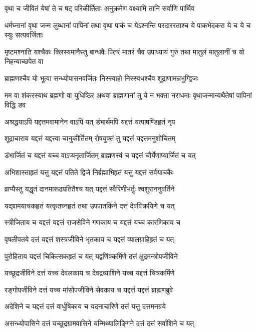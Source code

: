 \twolineshloka
{वृथा च जीवितं येषां ते च षट् परिकीर्तिताः}
{अनुक्रमेण वक्ष्यामि तानि सर्वाणि पार्थिव}


\threelineshloka
{धर्मघ्नानां वृथा जन्म लुब्धानां पापिनां तथा}
{वृथा पाकं च येऽश्नन्ति परदाररताश्च ये}
{पाकभेदकरा ये च ये च स्युः सत्यवर्जिताः}


\threelineshloka
{मृष्टमश्नाति यश्चैकः क्लिस्यमानैस्तु बान्धवैः}
{पितरं मातरं चैव उपाध्यायं गुरुं तथा}
{मातुलं मातुलानीं च यो निहन्याच्छपेत वा}


\twolineshloka
{ब्राह्मणश्चैव यो भूत्वा सन्ध्योपासनवर्जितः}
{निस्स्वाहो निस्स्वधश्चैव शूद्राणामन्नभुग्द्विजः}


\threelineshloka
{मम वा शंकरस्याथ ब्रह्मणो वा युधिष्ठिर}
{अथवा ब्राह्मणानां तु ये न भक्ता नराधमाः}
{वृथाजन्मान्यथैतेषां पापिनां विद्धि डव}


\twolineshloka
{अश्रद्धयाऽपि यद्दत्तमवामानेन वाऽपि यत्}
{डंभार्थमपि यद्दत्तं यत्पाषण्डिहृतं नृप}


\twolineshloka
{शूद्राचाराय यद्दत्तं यद्दत्त्वा चानुकीर्तितम्}
{रोषयुक्तं तु यद्दत्तं यद्दत्तमनुशोचितम्}


\twolineshloka
{डंभार्जितं च यद्दत्तं यच्च वाऽप्यनृतार्जितम्}
{ब्राह्मणस्वं च यद्दत्तं चौर्येणाप्यार्जितं च यत्}


\twolineshloka
{अभिशास्ताहृतं यत्तु यद्दत्तं पतिते द्विजे}
{निर्ब्रह्माभिहृतं यत्तु यद्दत्तं सर्वयाचकैः}


\twolineshloka
{व्राप्यैस्तु यद्धृतं दानमारूढपतितैश्च यत्}
{यद्दत्तं स्वैरिणीभर्तुः श्वशुराननुवर्तिने}


\twolineshloka
{यद्ग्रामयाचकहृतं यत्कृतघ्नहृतं तथा}
{उपपातकिने दत्तं देवविक्रयिणे च यत्}


\twolineshloka
{स्त्रीजिताय च यद्दत्तं यद्दत्तं राजसेविने}
{गणकाय च यद्दत्तं यच्च कारणिकाय च}


\twolineshloka
{वृषलीपतये दत्तं यद्दत्तं शस्त्रजीविने}
{भृतकाय च यद्दत्तं व्यालग्राहिहृतं च यत्}


\twolineshloka
{पुरोहिताय यद्दत्तं चिकित्सकहृतं च यत्}
{यद्वणिंक्कर्मिणे दत्तं क्षुद्रमन्त्रोपजीविने}


\twolineshloka
{यच्छूद्रजीविने दत्तं यच्च देवलकाय च}
{देवद्रव्याशिने यच्च यद्दत्तं चित्रकर्मिणे}


\twolineshloka
{रङ्गोपजीविने दत्तं यच्च मांसोपजीविने}
{सेवकाय च यद्दत्तं यद्दत्तं ब्राह्मणब्रुवे}


\twolineshloka
{अदेशिने च यद्दत्तं दत्तं वार्धुषिकाय च}
{यदनाचारिणे दत्तं यत्तु दत्तमनग्रये}


\twolineshloka
{असन्ध्योपासिने दत्तं यच्छूद्रग्रामवासिने}
{यन्मिथ्यालिङ्गिने दत्तं दत्तं सर्वाशिने च यत्}


